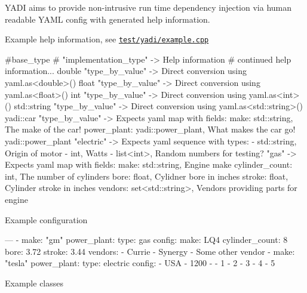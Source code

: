 Y\+A\+DI aims to provide non-\/intrusive run time dependency injection via human readable Y\+A\+ML config with generated help information.

Example help information, see \href{https://github.com/ebclark2/yadi/blob/master/test/yadi/example.cpp}{\tt test/yadi/example.\+cpp}


\begin{DoxyCode}
#base\_type
#    "implementation\_type" -> Help information
#        continued help information...
double
    "type\_by\_value" -> Direct conversion using yaml.as<double>()
float
    "type\_by\_value" -> Direct conversion using yaml.as<float>()
int
    "type\_by\_value" -> Direct conversion using yaml.as<int>()
std::string
    "type\_by\_value" -> Direct conversion using yaml.as<std::string>()
yadi::car
    "type\_by\_value" -> Expects yaml map with fields:
        make: std::string, The make of the car!
        power\_plant: yadi::power\_plant, What makes the car go!
yadi::power\_plant
    "electric" -> Expects yaml sequence with types:
         - std::string, Origin of motor
         - int, Watts
         - list<int>, Random numbers for testing?
    "gas" -> Expects yaml map with fields:
        make: std::string, Engine make
        cylinder\_count: int, The number of cylinders
        bore: float, Cylidner bore in inches
        stroke: float, Cylinder stroke in inches
        vendors: set<std::string>, Vendors providing parts for engine
\end{DoxyCode}
 Example configuration 
\begin{DoxyCode}
---
- make: "gm"
  power\_plant:
    type: gas
    config:
      make: LQ4
      cylinder\_count: 8
      bore: 3.72
      stroke: 3.44
      vendors:
        - Currie
        - Synergy
        - Some other vendor
- make: "tesla"
  power\_plant:
    type: electric
    config:
      - USA
      - 1200
      - - 1
        - 2
        - 3
        - 4
        - 5
\end{DoxyCode}
 Example classes 
